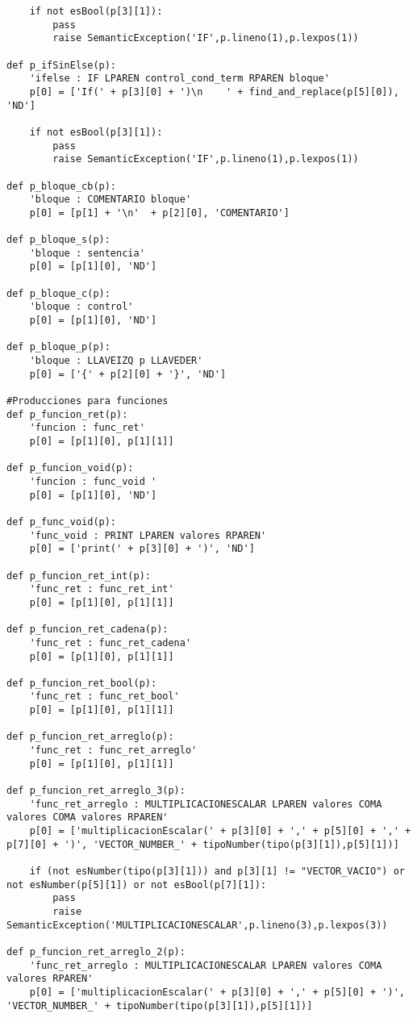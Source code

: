 \begin{verbatim}
    if not esBool(p[3][1]):
        pass
        raise SemanticException('IF',p.lineno(1),p.lexpos(1))

def p_ifSinElse(p):
    'ifelse : IF LPAREN control_cond_term RPAREN bloque'
    p[0] = ['If(' + p[3][0] + ')\n    ' + find_and_replace(p[5][0]), 'ND']

    if not esBool(p[3][1]):
        pass
        raise SemanticException('IF',p.lineno(1),p.lexpos(1))

def p_bloque_cb(p):
    'bloque : COMENTARIO bloque'
    p[0] = [p[1] + '\n'  + p[2][0], 'COMENTARIO']

def p_bloque_s(p):
    'bloque : sentencia'
    p[0] = [p[1][0], 'ND']

def p_bloque_c(p):
    'bloque : control'
    p[0] = [p[1][0], 'ND']

def p_bloque_p(p):
    'bloque : LLAVEIZQ p LLAVEDER'
    p[0] = ['{' + p[2][0] + '}', 'ND']

#Producciones para funciones
def p_funcion_ret(p):
    'funcion : func_ret'
    p[0] = [p[1][0], p[1][1]]

def p_funcion_void(p):
    'funcion : func_void '
    p[0] = [p[1][0], 'ND']

def p_func_void(p):
    'func_void : PRINT LPAREN valores RPAREN'
    p[0] = ['print(' + p[3][0] + ')', 'ND']

def p_funcion_ret_int(p):
    'func_ret : func_ret_int'
    p[0] = [p[1][0], p[1][1]]

def p_funcion_ret_cadena(p):
    'func_ret : func_ret_cadena'
    p[0] = [p[1][0], p[1][1]]

def p_funcion_ret_bool(p):
    'func_ret : func_ret_bool'
    p[0] = [p[1][0], p[1][1]]

def p_funcion_ret_arreglo(p):
    'func_ret : func_ret_arreglo'
    p[0] = [p[1][0], p[1][1]]

def p_funcion_ret_arreglo_3(p):
    'func_ret_arreglo : MULTIPLICACIONESCALAR LPAREN valores COMA valores COMA valores RPAREN'
    p[0] = ['multiplicacionEscalar(' + p[3][0] + ',' + p[5][0] + ',' + p[7][0] + ')', 'VECTOR_NUMBER_' + tipoNumber(tipo(p[3][1]),p[5][1])]

    if (not esNumber(tipo(p[3][1])) and p[3][1] != "VECTOR_VACIO") or not esNumber(p[5][1]) or not esBool(p[7][1]):
        pass
        raise SemanticException('MULTIPLICACIONESCALAR',p.lineno(3),p.lexpos(3))

def p_funcion_ret_arreglo_2(p):
    'func_ret_arreglo : MULTIPLICACIONESCALAR LPAREN valores COMA valores RPAREN'
    p[0] = ['multiplicacionEscalar(' + p[3][0] + ',' + p[5][0] + ')', 'VECTOR_NUMBER_' + tipoNumber(tipo(p[3][1]),p[5][1])]


\end{verbatim}
